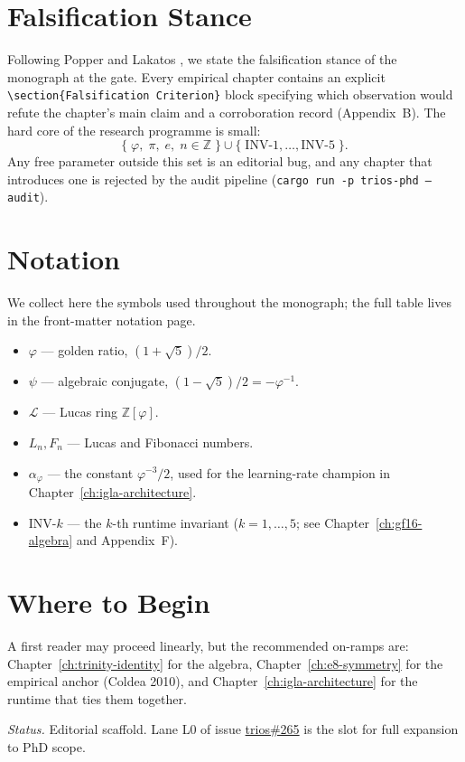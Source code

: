 \section{Falsification Stance}

Following Popper \cite{popper1959} and Lakatos \cite{lakatos1976}, we
state the falsification stance of the monograph at the gate. Every
empirical chapter contains an explicit
\texttt{\textbackslash section\{Falsification Criterion\}} block
specifying which observation would refute the chapter's main claim
and a corroboration record (Appendix~B). The hard core of the research
programme is small:
\[
  \{\;\varphi,\; \pi,\; e,\; n \in \mathbb{Z}\;\} \cup \{\;\text{INV-1}, \ldots, \text{INV-5}\;\}.
\]
Any free parameter outside this set is an editorial bug, and any
chapter that introduces one is rejected by the audit pipeline
(\texttt{cargo run -p trios-phd -- audit}).

\section{Notation}

We collect here the symbols used throughout the monograph; the full
table lives in the front-matter notation page.

\begin{itemize}
  \item \(\varphi\) — golden ratio, \((1+\sqrt{5})/2\).
  \item \(\psi\) — algebraic conjugate, \((1-\sqrt{5})/2 = -\varphi^{-1}\).
  \item \(\mathcal{L}\) — Lucas ring \(\mathbb{Z}[\varphi]\).
  \item \(L_n, F_n\) — Lucas and Fibonacci numbers.
  \item \(\alpha_\varphi\) — the constant \(\varphi^{-3}/2\), used for
        the learning-rate champion in Chapter~\ref{ch:igla-architecture}.
  \item \(\text{INV-}k\) — the \(k\)-th runtime invariant
        (\(k = 1, \ldots, 5\); see Chapter~\ref{ch:gf16-algebra} and
        Appendix~F).
\end{itemize}

\section{Where to Begin}

A first reader may proceed linearly, but the recommended on-ramps are:
Chapter~\ref{ch:trinity-identity} for the algebra,
Chapter~\ref{ch:e8-symmetry} for the empirical anchor (Coldea 2010),
and Chapter~\ref{ch:igla-architecture} for the runtime that ties
them together.

\smallskip

\noindent \emph{Status.} Editorial scaffold. Lane L0 of issue
\href{https://github.com/gHashTag/trios/issues/265}{trios\#265} is
the slot for full expansion to PhD scope.

